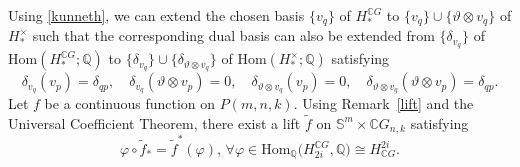 \documentclass{amsart}
\newcommand{\remref}[1]{Remark~\ref{#1}}
\renewcommand{\hom}{\mathrm{Hom}}
\begin{document}
	
	Using \eqref{kunneth}, we can extend the chosen basis $\{v_q\}$ of $H_*^{\mathbb{C}G}$ to $	\{v_q\} \cup \{\vartheta \otimes v_q\}$ of $H_*^\times$ such that the corresponding dual basis can also be extended from $\{\delta_{v_q}\}$ of $ \hom (H_*^{\mathbb{C}G};\mathbb{Q})$ to $\{\delta_{v_q}\} \cup \{\delta_{\vartheta \otimes v_q}\} $ of %
$\hom (H_*^{\times};\mathbb{Q})$ satisfying
	\begin{equation}\label{Kronecker relations}
		\delta_{v_q}( v_p) = \delta_{qp}, \quad
		\delta_{v_q}( \vartheta \otimes v_p)= 0, \quad
		\delta_{\vartheta\otimes v_q}(v_p) = 0, \quad
		\delta_{\vartheta\otimes v_q}(\vartheta \otimes v_p)= \delta_{qp}.
	\end{equation}
	Let $f$ %
be a continuous function on $P(m,n,k)$. Using \remref{lift} and the Universal Coefficient Theorem, there exist a lift $\tilde{f}$ on $\mathbb{S}^m\times \mathbb{C}G_{n,k}$ %
satisfying \begin{equation}\label{comm with phi}
		\varphi \circ \tilde{f}_* = \tilde{f}^*(\varphi) , \, \forall
		\varphi \in \hom _{\mathbb Q}\big(H_{2i}^{\mathbb CG}, \mathbb Q\big)\cong H^{2i}_{\mathbb CG}.
	\end{equation}
	
\end{document}
